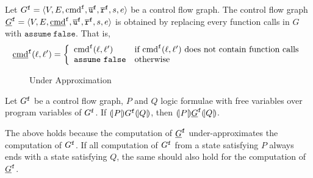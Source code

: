 
Let $G^{\mathtt{{f}}} = \langle V, E, \textmd{cmd}^{\mathtt{{f}}}, \overline{\texttt{u}}^{\mathtt{{f}}}, \overline{\texttt{r}}^{\mathtt{{f}}},s,e \rangle$ be a control flow
graph. The control flow graph $\underline{G}^{\mathtt{{f}}} = \langle V, E,
\underline{\textmd{cmd}}^{\mathtt{{f}}}, \overline{\texttt{u}}^{\mathtt{{f}}}, \overline{\texttt{r}}^{\mathtt{{f}}},s,e \rangle$ is obtained by replacing every
function calls in $G$ with $\mathtt{assume\ false}$. That is,
\begin{equation*}
  \underline{\textmd{cmd}}^{\mathtt{{f}}} (\ell, \ell') =
  \left\{
    \begin{array}{ll}
      \textmd{cmd}^{\mathtt{{f}}} (\ell, \ell') & 
      \textmd{if } \textmd{cmd}^{\mathtt{{f}}} (\ell, \ell') 
      \textmd{ does not contain function calls}\\
      \mathtt{assume\ false} &
      \textmd{otherwise}
    \end{array}
  \right.
\end{equation*}

\begin{figure}
  \centering

  \caption{Under Approximation}
  \label{figure:under-approximation}
\end{figure}

\begin{proposition}
  Let $G^{\mathtt{{f}}}$ be a control flow graph, $P$ and $Q$ logic formulae with
  free variables over program variables of $G^{\mathtt{{f}}}$. If $(\!| {P} |\!)
  G^{\mathtt{{f}}} (\!| {Q} |\!)$, then 
  $(\!| {P} |\!) \underline{G}^{\mathtt{{f}}} (\!| {Q} |\!)$.
\end{proposition}
The above holds because the computation of $\underline{G}^{\mathtt{{f}}}$ under-approximates the computation of $G^{\mathtt{{f}}}$. If all computation of $G^{\mathtt{{f}}}$ from a state satisfying $P$ always ends with a state satisfying $Q$, the same should also hold for the computation of $\underline{G}^{\mathtt{{f}}}$.